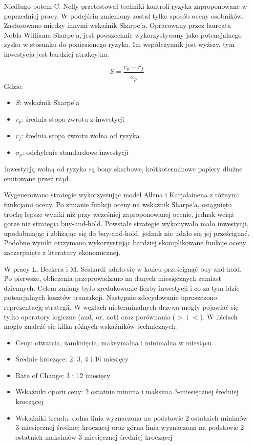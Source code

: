 \documentclass[twoside]{iisthesis}
\begin{document}
Niedługo potem C. Nelly \cite{Neely200369} przetestował techniki kontroli ryzyka zaproponowane w poprzedniej pracy. W podejściu zmieniony został tylko sposób oceny osobników. Zastosowano między innymi wskaźnik Sharpe'a. Opracowany przez laureata Nobla Williama Sharpe'a, jest powszechnie wykorzystywany jako potencjalnego zysku w stosunku do poniesionego ryzyka. Im współczynnik jest wyższy, tym inwestycja jest bardziej atrakcyjna.

\[S=\frac{r_{p} - r_{f}}{\sigma_{p}}\]
Gdzie:
\begin{itemize}[label=]
	\item $S$: wskaźnik Sharpe'a
	\item $r_p$: średnia stopa zwrotu z inwestycji
	\item $r_f$: średnia stopa zwrotu wolna od ryzyka
	\item $\sigma_p$: odchylenie standardowe inwestycji
\end{itemize}

Inwestycją wolną od ryzyka są bony skarbowe, krótkoterminowe papiery dłużne emitowane przez rząd.

Wygenerowano strategie wykorzystując model Allena i Karjalainena z różnymi funkcjami oceny. Po zmianie funkcji oceny na wskaźnik Sharpe'a, osiągnięto trochę lepsze wyniki niż przy wcześniej zaproponowanej ocenie, jednak wciąż gorze niż strategia buy-and-hold. Powstałe strategie wykonywało mało inwestycji, upodabniając i zbliżając się do buy-and-hold, jednak nie udało się jej prześcignąć. Podobne wyniki otrzymano wykorzystując bardziej skomplikowane funkcje oceny zaczerpnięte z literatury ekonomicznej.

W pracy L. Beckera i M. Seshardi \cite{Becker:2003} udało się w końcu prześcignąć buy-and-hold. Po pierwsze, obliczenia przeprowadzano na danych miesięcznych zamiast dziennych. Celem zmiany było zredukowanie liczby inwestycji i co za tym idzie potencjalnych kosztów transakcji. Następnie zdecydowanie uproszczono reprezentację strategii. W węzłach nieterminalnych drzewa mogły pojawiać się tylko operatory logiczne (and, or, not) oraz porównania ($>$ i $<$).  W liściach mogło znaleźć się kilka różnych wskaźników technicznych:

\begin{itemize}
	\item Ceny: otwarcia, zamknięcia, maksymalna i minimalna w miesiącu
	\item Średnie kroczące: 2, 3, 4 i 10 miesięcy
	\item Rate of Change: 3 i 12 miesięcy
	\item Wskaźniki oporu ceny: 2 ostatnie minima i maksima 3-miesięcznej średniej kroczącej
	\item Wskaźniki trendu: dolna linia wyznaczona na podstawie 2 ostatnich minimów 3-miesięcznej średniej kroczącej oraz górna linia wyznaczona na podstawie 2 ostatnich maksimów 3-miesięcznej średniej kroczącej
\end{itemize}
\end{document}
